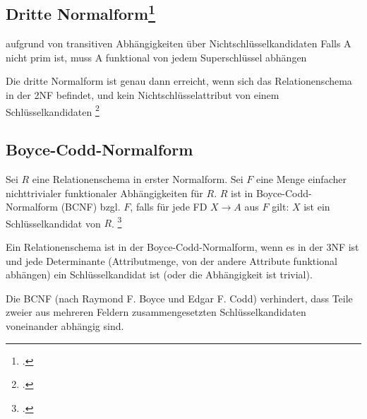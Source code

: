 \documentclass{bschlangaul-haupt}
\begin{document}
\subsection{Dritte Normalform\footcite[Seite 201]{winter}}

aufgrund von transitiven Abhängigkeiten über Nichtschlüsselkandidaten
Falls A nicht prim ist, muss A funktional von jedem Superschlüssel
abhängen

Die dritte Normalform ist genau dann erreicht, wenn sich das
Relationenschema in der 2NF befindet, und kein Nichtschlüsselattribut
von einem Schlüsselkandidaten \footcite[Dritte
Normalform (3NF)]{wiki:normalisierung}








%

\subsection{Boyce-Codd-Normalform}

Sei $R$ eine Relationenschema in erster Normalform. Sei $F$ eine Menge
einfacher nichttrivialer funktionaler Abhängigkeiten für $R$. $R$ ist in
Boyce-Codd-Normalform (BCNF) bzgl. $F$, falls für jede FD $X \rightarrow
A$ aus $F$ gilt: $X$ ist ein Schlüsselkandidat von $R$.
\footcite[Boyce-Codd-Normalform (BCNF)]{wiki:normalisierung}

Ein Relationenschema ist in der Boyce-Codd-Normalform, wenn es in der
3NF ist und jede Determinante (Attributmenge, von der andere Attribute
funktional abhängen) ein Schlüsselkandidat ist (oder die Abhängigkeit
ist trivial).

Die BCNF (nach Raymond F. Boyce und Edgar F. Codd) verhindert, dass
Teile zweier aus mehreren Feldern zusammengesetzten Schlüsselkandidaten
voneinander abhängig sind.
\end{document}

